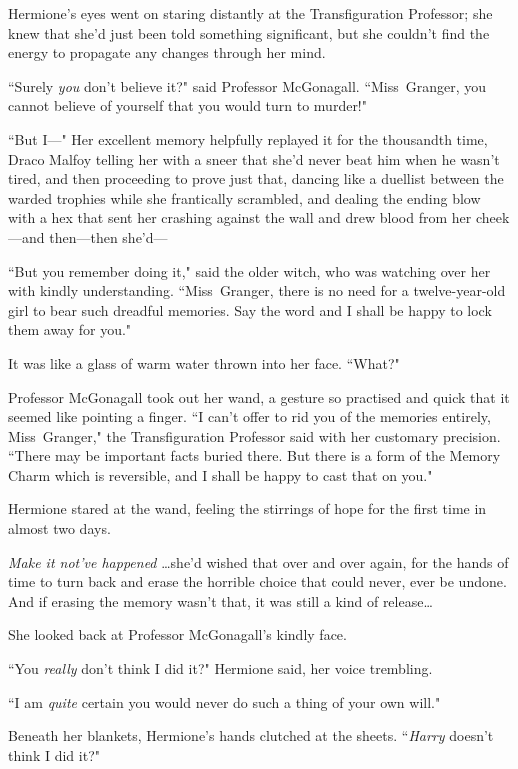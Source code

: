 Hermione's eyes went on staring distantly at the Transfiguration Professor; she knew that she'd just been told something significant, but she couldn't find the energy to propagate any changes through her mind.

``Surely \emph{you} don't believe it?" said Professor McGonagall. ``Miss~Granger, you cannot believe of yourself that you would turn to murder!"

``But I—" Her excellent memory helpfully replayed it for the thousandth time, Draco Malfoy telling her with a sneer that she'd never beat him when he wasn't tired, and then proceeding to prove just that, dancing like a duellist between the warded trophies while she frantically scrambled, and dealing the ending blow with a hex that sent her crashing against the wall and drew blood from her cheek—and then—then she'd—

``But you remember doing it," said the older witch, who was watching over her with kindly understanding. ``Miss~Granger, there is no need for a twelve-year-old girl to bear such dreadful memories. Say the word and I shall be happy to lock them away for you."

It was like a glass of warm water thrown into her face. ``What?"

Professor McGonagall took out her wand, a gesture so practised and quick that it seemed like pointing a finger. ``I can't offer to rid you of the memories entirely, Miss~Granger," the Transfiguration Professor said with her customary precision. ``There may be important facts buried there. But there is a form of the Memory Charm which is reversible, and I shall be happy to cast that on you."

Hermione stared at the wand, feeling the stirrings of hope for the first time in almost two days.

\emph{Make it not've happened} {\ldots}she'd wished that over and over again, for the hands of time to turn back and erase the horrible choice that could never, ever be undone. And if erasing the memory wasn't that, it was still a kind of release{\ldots}

She looked back at Professor McGonagall's kindly face.

``You \emph{really} don't think I did it?" Hermione said, her voice trembling.

``I am \emph{quite} certain you would never do such a thing of your own will."

Beneath her blankets, Hermione's hands clutched at the sheets. ``\emph{Harry} doesn't think I did it?"

